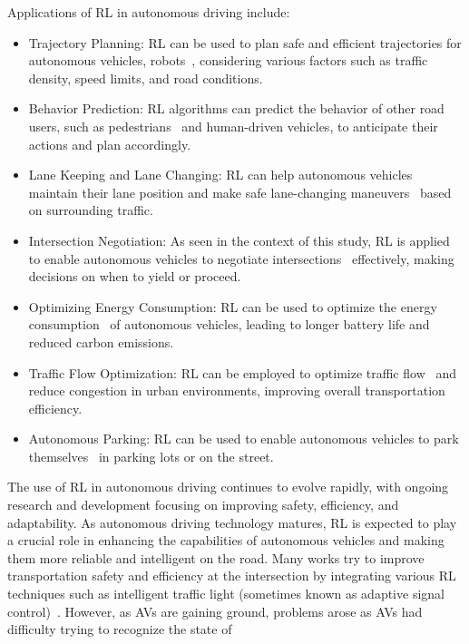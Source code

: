 Applications of RL in autonomous driving include:
\begin{itemize}
    \item Trajectory Planning: RL can be used to plan safe and efficient trajectories for autonomous vehicles, robots~\cite{9940484, 10.3389/fnbot.2022.883562}, considering various factors such as traffic density, speed limits, and road conditions.
    \item Behavior Prediction: RL algorithms can predict the behavior of other road users, such as pedestrians~\cite{Fintz2022} and human-driven vehicles, to anticipate their actions and plan accordingly.
    \item Lane Keeping and Lane Changing: RL can help autonomous vehicles maintain their lane position and make safe lane-changing maneuvers~\cite{Zhou2022} based on surrounding traffic.
    \item Intersection Negotiation: As seen in the context of this study, RL is applied to enable autonomous vehicles to negotiate intersections~\cite{qian2017autonomous, peng2021learning, wu2020cooperative} effectively, making decisions on when to yield or proceed.
    \item Optimizing Energy Consumption: RL can be used to optimize the energy consumption~\cite{HE2021176, s20082361} of autonomous vehicles, leading to longer battery life and reduced carbon emissions.
    \item Traffic Flow Optimization: RL can be employed to optimize traffic flow~\cite{WALRAVEN2016203} and reduce congestion in urban environments, improving overall transportation efficiency.
    \item Autonomous Parking: RL can be used to enable autonomous vehicles to park themselves~\cite{s22176655} in parking lots or on the street.
\end{itemize}
The use of RL in autonomous driving continues to evolve rapidly, with ongoing research and development focusing on improving safety, efficiency, and adaptability.
As autonomous driving technology matures, RL is expected to play a crucial role in enhancing the capabilities of autonomous vehicles and making them more reliable and intelligent on the road.
Many works try to improve transportation safety and
efficiency at the intersection by integrating various RL
techniques such as intelligent traffic light (sometimes known
as adaptive signal control)~\cite{yang2022inductive, wang2021adaptive, essa2020selflearning}.
However, as AVs are gaining ground, problems
arose as AVs had difficulty trying to recognize the state of
